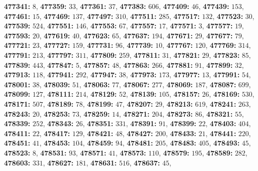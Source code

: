 \textsf{\bfseries 477341:} $8$, \textsf{\bfseries 477359:} $33$, \textsf{\bfseries 477361:} $37$, \textsf{\bfseries 477383:} $606$, \textsf{\bfseries 477409:} $46$, \textsf{\bfseries 477439:} $153$, \textsf{\bfseries 477461:} $15$, \textsf{\bfseries 477469:} $137$, \textsf{\bfseries 477497:} $310$, \textsf{\bfseries 477511:} $285$, \textsf{\bfseries 477517:} $132$, \textsf{\bfseries 477523:} $30$, \textsf{\bfseries 477539:} $524$, \textsf{\bfseries 477551:} $146$, \textsf{\bfseries 477553:} $67$, \textsf{\bfseries 477557:} $17$, \textsf{\bfseries 477571:} $3$, \textsf{\bfseries 477577:} $19$, \textsf{\bfseries 477593:} $20$, \textsf{\bfseries 477619:} $40$, \textsf{\bfseries 477623:} $65$, \textsf{\bfseries 477637:} $194$, \textsf{\bfseries 477671:} $29$, \textsf{\bfseries 477677:} $79$, \textsf{\bfseries 477721:} $23$, \textsf{\bfseries 477727:} $159$, \textsf{\bfseries 477731:} $96$, \textsf{\bfseries 477739:} $10$, \textsf{\bfseries 477767:} $120$, \textsf{\bfseries 477769:} $314$, \textsf{\bfseries 477791:} $213$, \textsf{\bfseries 477797:} $311$, \textsf{\bfseries 477809:} $259$, \textsf{\bfseries 477811:} $31$, \textsf{\bfseries 477821:} $29$, \textsf{\bfseries 477823:} $85$, \textsf{\bfseries 477839:} $443$, \textsf{\bfseries 477847:} $5$, \textsf{\bfseries 477857:} $48$, \textsf{\bfseries 477863:} $266$, \textsf{\bfseries 477881:} $91$, \textsf{\bfseries 477899:} $32$, \textsf{\bfseries 477913:} $118$, \textsf{\bfseries 477941:} $292$, \textsf{\bfseries 477947:} $38$, \textsf{\bfseries 477973:} $173$, \textsf{\bfseries 477977:} $13$, \textsf{\bfseries 477991:} $54$, \textsf{\bfseries 478001:} $38$, \textsf{\bfseries 478039:} $51$, \textsf{\bfseries 478063:} $77$, \textsf{\bfseries 478067:} $277$, \textsf{\bfseries 478069:} $187$, \textsf{\bfseries 478087:} $699$, \textsf{\bfseries 478099:} $127$, \textsf{\bfseries 478111:} $214$, \textsf{\bfseries 478129:} $52$, \textsf{\bfseries 478139:} $105$, \textsf{\bfseries 478157:} $26$, \textsf{\bfseries 478169:} $530$, \textsf{\bfseries 478171:} $507$, \textsf{\bfseries 478189:} $78$, \textsf{\bfseries 478199:} $47$, \textsf{\bfseries 478207:} $29$, \textsf{\bfseries 478213:} $619$, \textsf{\bfseries 478241:} $263$, \textsf{\bfseries 478243:} $20$, \textsf{\bfseries 478253:} $73$, \textsf{\bfseries 478259:} $14$, \textsf{\bfseries 478271:} $204$, \textsf{\bfseries 478273:} $86$, \textsf{\bfseries 478321:} $55$, \textsf{\bfseries 478339:} $252$, \textsf{\bfseries 478343:} $26$, \textsf{\bfseries 478351:} $331$, \textsf{\bfseries 478391:} $91$, \textsf{\bfseries 478399:} $22$, \textsf{\bfseries 478403:} $404$, \textsf{\bfseries 478411:} $22$, \textsf{\bfseries 478417:} $129$, \textsf{\bfseries 478421:} $48$, \textsf{\bfseries 478427:} $200$, \textsf{\bfseries 478433:} $21$, \textsf{\bfseries 478441:} $220$, \textsf{\bfseries 478451:} $41$, \textsf{\bfseries 478453:} $104$, \textsf{\bfseries 478459:} $94$, \textsf{\bfseries 478481:} $205$, \textsf{\bfseries 478483:} $405$, \textsf{\bfseries 478493:} $45$, \textsf{\bfseries 478523:} $8$, \textsf{\bfseries 478531:} $93$, \textsf{\bfseries 478571:} $41$, \textsf{\bfseries 478573:} $110$, \textsf{\bfseries 478579:} $195$, \textsf{\bfseries 478589:} $282$, \textsf{\bfseries 478603:} $331$, \textsf{\bfseries 478627:} $181$, \textsf{\bfseries 478631:} $516$, \textsf{\bfseries 478637:} $45$, 
